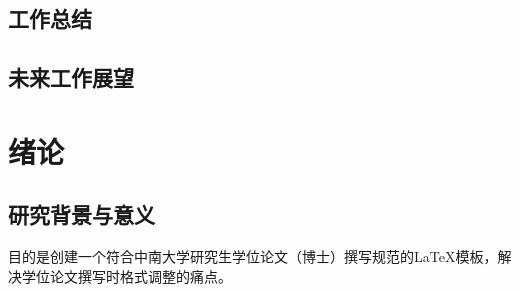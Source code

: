 \subsection{工作总结}
\subsection{未来工作展望}

\section{绪论}
\subsection{研究背景与意义}

目的是创建一个符合中南大学研究生学位论文（博士）撰写规范的LaTeX模板，解决学位论文撰写时格式调整的痛点。

